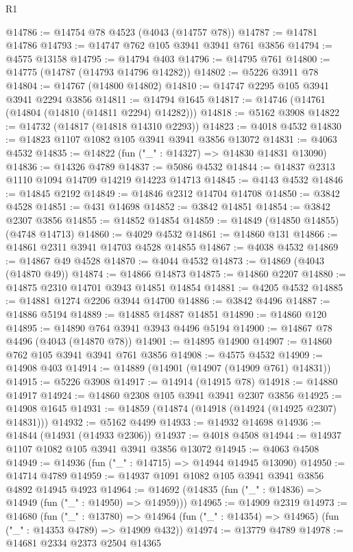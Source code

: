 \begin{lexlean}{R1}
\begin{coremodule}
@14786 := @14754 @78 @4523 (@4043 (@14757 @78))
@14787 := @14781 @14786
@14793 := @14747 @762 @105 @3941 @3941 @761 @3856
@14794 := @4575 @13158
@14795 := @14794 @403
@14796 := @14795 @761
@14800 := @14775 (@14787 (@14793 @14796 @14282))
@14802 := @5226 @3911 @78
@14804 := @14767 (@14800 @14802)
@14810 := @14747 @2295 @105 @3941 @3941 @2294 @3856
@14811 := @14794 @1645
@14817 := @14746 (@14761 (@14804 (@14810 (@14811 @2294) @14282)))
@14818 := @5162 @3908
@14822 := @14732 (@14817 (@14818 @14310 @2293))
@14823 := @4018 @4532
@14830 := @14823 @1107 @1082 @105 @3941 @3941 @3856 @13072
@14831 := @4063 @4532
@14835 := @14822 (fun ("_" : @14327) => @14830 @14831 @13090)
@14836 := @14326 @4789
@14837 := @5086 @4532
@14844 := @14837 @2313 @1110 @1094 @14709 @14219 @14223 @14713
@14845 := @4143 @4532
@14846 := @14845 @2192
@14849 := @14846 @2312 @14704 @14708
@14850 := @3842 @4528
@14851 := @431 @14698
@14852 := @3842 @14851
@14854 := @3842 @2307 @3856
@14855 := @14852 @14854
@14859 := @14849 (@14850 @14855) (@4748 @14713)
@14860 := @4029 @4532
@14861 := @14860 @131
@14866 := @14861 @2311 @3941 @14703 @4528 @14855
@14867 := @4038 @4532
@14869 := @14867 @49 @4528
@14870 := @4044 @4532
@14873 := @14869 (@4043 (@14870 @49))
@14874 := @14866 @14873
@14875 := @14860 @2207
@14880 := @14875 @2310 @14701 @3943 @14851 @14854
@14881 := @4205 @4532
@14885 := @14881 @1274 @2206 @3944 @14700
@14886 := @3842 @4496
@14887 := @14886 @5194
@14889 := @14885 @14887 @14851
@14890 := @14860 @120
@14895 := @14890 @764 @3941 @3943 @4496 @5194
@14900 := @14867 @78 @4496 (@4043 (@14870 @78))
@14901 := @14895 @14900
@14907 := @14860 @762 @105 @3941 @3941 @761 @3856
@14908 := @4575 @4532
@14909 := @14908 @403
@14914 := @14889 (@14901 (@14907 (@14909 @761) @14831))
@14915 := @5226 @3908
@14917 := @14914 (@14915 @78)
@14918 := @14880 @14917
@14924 := @14860 @2308 @105 @3941 @3941 @2307 @3856
@14925 := @14908 @1645
@14931 := @14859 (@14874 (@14918 (@14924 (@14925 @2307) @14831)))
@14932 := @5162 @4499
@14933 := @14932 @14698
@14936 := @14844 (@14931 (@14933 @2306))
@14937 := @4018 @4508
@14944 := @14937 @1107 @1082 @105 @3941 @3941 @3856 @13072
@14945 := @4063 @4508
@14949 := @14936 (fun ("_" : @14715) => @14944 @14945 @13090)
@14950 := @14714 @4789
@14959 := @14937 @1091 @1082 @105 @3941 @3941 @3856 @4892 @14945 @4923
@14964 := @14692 (@14835 (fun ("_" : @14836) => @14949 (fun ("_" : @14950) => @14959)))
@14965 := @14909 @2319
@14973 := @14680
    (fun ("_" : @13780) =>
    @14964 (fun ("_" : @14354) => @14965) (fun ("_" : @14353 @4789) => @14909 @432))
@14974 := @13779 @4789
@14978 := @14681 @2334 @2373 @2504 @14365

\end{coremodule}
\end{lexlean}

